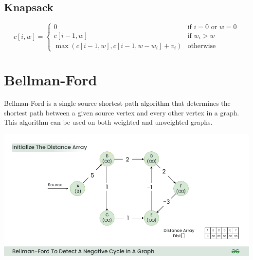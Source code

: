 \documentclass{article}
\begin{document}
\begin{multicols*}{2}
    \subsection*{Knapsack}
    \begin{equation*}
        c[i, w] = \begin{cases}
            0                                    & \text{if } i = 0 \text{ or } w = 0 \\
            c[i-1, w]                            & \text{if } w_i > w                 \\
            \max(c[i-1, w], c[i-1, w-w_i] + v_i) & \text{otherwise}
        \end{cases}
    \end{equation*}

    \section*{Bellman-Ford}
    Bellman-Ford is a single source shortest path algorithm that determines the
    shortest path between a given source vertex and every other vertex in a
    graph. This algorithm can be used on both weighted and unweighted graphs.

    \includegraphics[width=\linewidth]{bellman.png}


\end{multicols*}
\end{document}
